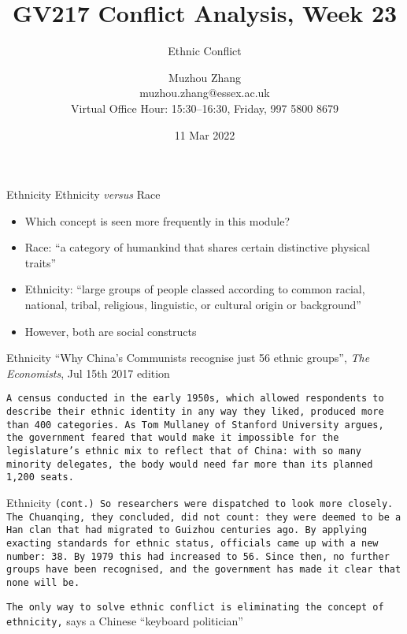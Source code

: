 \documentclass[handout]{beamer}
\title{GV217 Conflict Analysis, Week 23}
\subtitle{Ethnic Conflict}
\author{Muzhou Zhang\\ muzhou.zhang@essex.ac.uk\\ Virtual Office Hour: 15:30--16:30, Friday, 997 5800 8679}
\date{11 Mar 2022}
\begin{document}
\maketitle
{}

\begin{frame}{Ethnicity}
    \pause Ethnicity \textit{versus} Race
    \begin{itemize}
        \pause\item Which concept is seen more frequently in this module?
        \pause\item Race: ``a category of humankind that shares certain distinctive physical traits''
        \pause\item Ethnicity: ``large groups of people classed according to common racial, national, tribal, religious, linguistic, or cultural origin or background''
        \pause\item However, both are social constructs
    \end{itemize}
\end{frame}

\begin{frame}{Ethnicity}
    \pause ``Why China's Communists recognise just 56 ethnic groups'', \textit{The Economists}, Jul 15th 2017 edition
    \vspace{30pt}

    \pause\texttt{\scriptsize A census conducted in the early 1950s, which allowed respondents to describe their ethnic identity in any way they liked, produced more than 400 categories. As Tom Mullaney of Stanford University argues, the government feared that would make it impossible for the legislature's ethnic mix to reflect that of China: with so many minority delegates, the body would need far more than its planned 1,200 seats.}
\end{frame}

\begin{frame}{Ethnicity}
    \pause\texttt{\scriptsize (cont.) So researchers were dispatched to look more closely. The Chuanqing, they concluded, did not count: they were deemed to be a Han clan that had migrated to Guizhou centuries ago. By applying exacting standards for ethnic status, officials came up with a new number: 38. By 1979 this had increased to 56. Since then, no further groups have been recognised, and the government has made it clear that none will be.}
    \vspace{15pt}

    \pause\texttt{The only way to solve ethnic conflict is eliminating the concept of ethnicity,} says a Chinese ``keyboard politician''
\end{frame}
\end{document}
